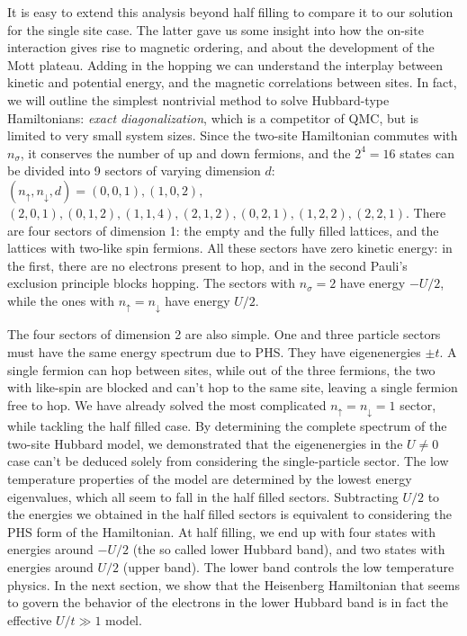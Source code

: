 It is easy to extend this analysis beyond half filling to compare it to our solution for the single site case.
The latter gave us some insight into how the on-site interaction gives rise to magnetic ordering, and about the development of the Mott plateau.
Adding in the hopping we can understand the interplay between kinetic and potential energy, and the magnetic correlations between sites.
In fact, we will outline the simplest nontrivial method to solve Hubbard-type Hamiltonians: \emph{exact diagonalization}, which is a competitor of \acs{QMC}, but is limited to very small system sizes.
Since the two-site Hamiltonian commutes with $n_\sigma$, it conserves the number of up and down fermions, and the $2^4 = 16$ states can be divided into 9 sectors of varying dimension $d$: $(n_\uparrow, n_\downarrow, d) = (0, 0, 1), (1, 0, 2),$
$ (2, 0, 1), (0, 1, 2), (1, 1, 4), (2, 1, 2), (0, 2, 1), (1, 2, 2), (2,2, 1)$.
There are four sectors of dimension 1: the empty and the fully filled lattices, and the lattices with two-like spin fermions.
All these sectors have zero kinetic energy: in the first, there are no electrons present to hop, and in the second Pauli's exclusion principle blocks hopping.
The sectors with $n_\sigma = 2$ have energy $- U / 2$, while the ones with $n_\uparrow = n_\downarrow$ have energy $U / 2$.

The four sectors of dimension 2 are also simple.
One and three particle sectors must have the same energy spectrum due to \acf{PHS}.
They have eigenenergies $\pm t$.
A single fermion can hop between sites, while out of the three fermions, the two with like-spin are blocked and can't hop to the same site, leaving a single fermion free to hop.
We have already solved the most complicated $n_\uparrow = n_\downarrow = 1$ sector, while tackling the half filled case.
By determining the complete spectrum of the two-site Hubbard model, we demonstrated that the eigenenergies in the $U \neq 0$ case can't be deduced solely from considering the single-particle sector.
The low temperature properties of the model are determined by the lowest energy eigenvalues, which all seem to fall in the half filled sectors.
Subtracting $U / 2$ to the energies we obtained in the half filled sectors is equivalent to considering the \acs{PHS} form of the Hamiltonian. 
At half filling, we end up with four states with energies around $-U / 2$ (the so called lower Hubbard band), and two states with energies around $U / 2$ (upper band).
The lower band controls the low temperature physics.
In the next section, we show that the Heisenberg Hamiltonian that seems to govern the behavior of the electrons in the lower Hubbard band is in fact the effective $U / t \gg 1$ model.

